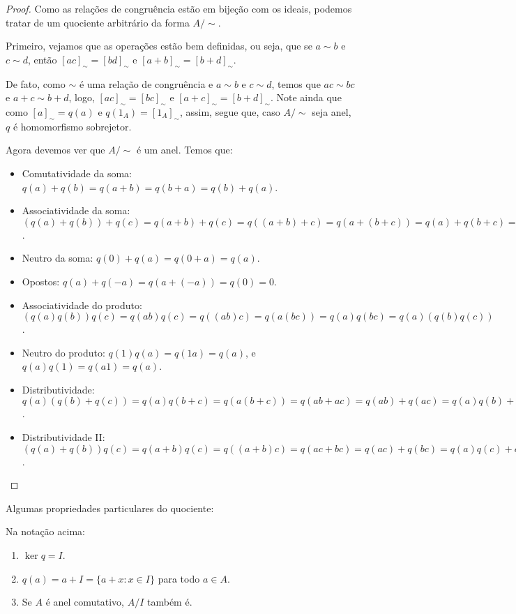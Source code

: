 \begin{proof}
    Como as relações de congruência estão em bijeção com os ideais, podemos tratar de um quociente arbitrário da forma $A/\sim$.
    
    Primeiro, vejamos que as operações estão bem definidas, ou seja, que se $a\sim b$ e $c\sim d$, então $[ac]_\sim=[bd]_\sim$ e $[a+b]_\sim=[b+d]_\sim$.
    
    De fato, como $\sim$ é uma relação de congruência e $a\sim b$ e $c\sim d$, temos que $ac\sim bc$ e $a+c\sim b+d$, logo, $[ac]_\sim=[bc]_\sim$ e $[a+c]_\sim=[b+d]_\sim$.
    Note ainda que como $[a]_\sim=q(a)$ e $q(1_A)=[1_A]_\sim$, assim, segue que, caso $A/\sim$ seja anel, $q$ é homomorfismo sobrejetor.

    Agora devemos ver que $A/\sim$ é um anel. Temos que:

    \begin{itemize}
        \item Comutatividade da soma: $q(a)+q(b)=q(a+b)=q(b+a)=q(b)+q(a)$.
        \item Associatividade da soma: $(q(a)+q(b))+q(c)=q(a+b)+q(c)=q((a+b)+c)=q(a+(b+c))=q(a)+q(b+c)=q(a)+(q(b)+q(c))$.
        \item Neutro da soma: $q(0)+q(a)=q(0+a)=q(a)$.
        \item Opostos: $q(a)+q(-a)=q(a+(-a))=q(0)=0$.
        \item Associatividade do produto:$(q(a)q(b))q(c)=q(ab)q(c)=q((ab)c)=q(a(bc))=q(a)q(bc)=q(a)(q(b)q(c))$.
        \item Neutro do produto: $q(1)q(a)=q(1a)=q(a)$, e $q(a)q(1)=q(a1)=q(a)$.
        \item Distributividade: $q(a)(q(b)+q(c))=q(a)q(b+c)=q(a(b+c))=q(ab+ac)=q(ab)+q(ac)=q(a)q(b)+q(a)q(c)$.
        \item Distributividade II: $(q(a)+q(b))q(c)=q(a+b)q(c)=q((a+b)c)=q(ac+bc)=q(ac)+q(bc)=q(a)q(c)+q(b)q(c)$.
    \end{itemize}
        
\end{proof}

Algumas propriedades particulares do quociente:

\begin{lemma}
    Na notação acima:
    \begin{enumerate}[label=\alph*)]
        \item $\ker q = I$. \label{lemma:propriedadesQuociente_a}
        \item $q(a)=a+I=\{a+x: x \in I\}$ para todo $a \in A$. \label{lemma:propriedadesQuociente_b}
        \item Se $A$ é anel comutativo, $A/I$ também é. \label{lemma:propriedadesQuociente_c}
    \end{enumerate}
\end{lemma}

